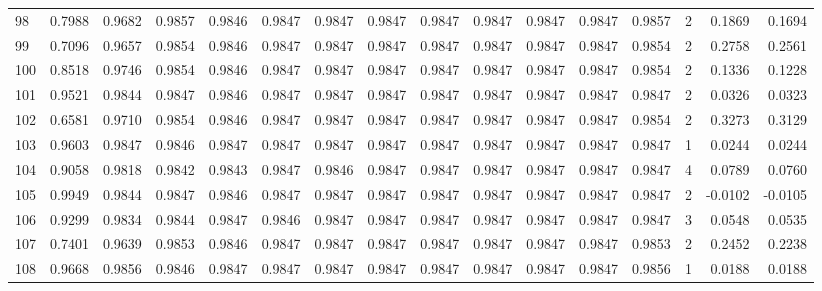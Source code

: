 \begin{tabular}{lrrrrrrrrrrrrrrr}
98  &      0.7988 &  0.9682 &  0.9857 &  0.9846 &  0.9847 &  0.9847 &  0.9847 &  0.9847 &  0.9847 &  0.9847 &   0.9847 &     0.9857 &      2 &                    0.1869 &                     0.1694 \\
99  &      0.7096 &  0.9657 &  0.9854 &  0.9846 &  0.9847 &  0.9847 &  0.9847 &  0.9847 &  0.9847 &  0.9847 &   0.9847 &     0.9854 &      2 &                    0.2758 &                     0.2561 \\
100 &      0.8518 &  0.9746 &  0.9854 &  0.9846 &  0.9847 &  0.9847 &  0.9847 &  0.9847 &  0.9847 &  0.9847 &   0.9847 &     0.9854 &      2 &                    0.1336 &                     0.1228 \\
101 &      0.9521 &  0.9844 &  0.9847 &  0.9846 &  0.9847 &  0.9847 &  0.9847 &  0.9847 &  0.9847 &  0.9847 &   0.9847 &     0.9847 &      2 &                    0.0326 &                     0.0323 \\
102 &      0.6581 &  0.9710 &  0.9854 &  0.9846 &  0.9847 &  0.9847 &  0.9847 &  0.9847 &  0.9847 &  0.9847 &   0.9847 &     0.9854 &      2 &                    0.3273 &                     0.3129 \\
103 &      0.9603 &  0.9847 &  0.9846 &  0.9847 &  0.9847 &  0.9847 &  0.9847 &  0.9847 &  0.9847 &  0.9847 &   0.9847 &     0.9847 &      1 &                    0.0244 &                     0.0244 \\
104 &      0.9058 &  0.9818 &  0.9842 &  0.9843 &  0.9847 &  0.9846 &  0.9847 &  0.9847 &  0.9847 &  0.9847 &   0.9847 &     0.9847 &      4 &                    0.0789 &                     0.0760 \\
105 &      0.9949 &  0.9844 &  0.9847 &  0.9846 &  0.9847 &  0.9847 &  0.9847 &  0.9847 &  0.9847 &  0.9847 &   0.9847 &     0.9847 &      2 &                   -0.0102 &                    -0.0105 \\
106 &      0.9299 &  0.9834 &  0.9844 &  0.9847 &  0.9846 &  0.9847 &  0.9847 &  0.9847 &  0.9847 &  0.9847 &   0.9847 &     0.9847 &      3 &                    0.0548 &                     0.0535 \\
107 &      0.7401 &  0.9639 &  0.9853 &  0.9846 &  0.9847 &  0.9847 &  0.9847 &  0.9847 &  0.9847 &  0.9847 &   0.9847 &     0.9853 &      2 &                    0.2452 &                     0.2238 \\
108 &      0.9668 &  0.9856 &  0.9846 &  0.9847 &  0.9847 &  0.9847 &  0.9847 &  0.9847 &  0.9847 &  0.9847 &   0.9847 &     0.9856 &      1 &                    0.0188 &                     0.0188 \\

\end{tabular}

